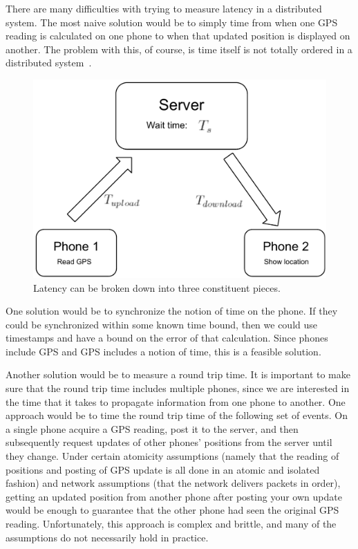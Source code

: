 \documentclass{acm_proc_article-sp}
\begin{document}
There are many difficulties with trying to measure latency in a
distributed system.  The most naive solution would be to simply time
from when one GPS reading is calculated on one phone to when that
updated position is displayed on another. The problem with this, of
course, is time itself is not totally ordered in a distributed
system~\cite{Lamport:1978:TCO}.

\begin{figure}
\centering
\includegraphics[scale=0.4]{figs/LatencyExplanation}
\caption{Latency can be broken down into three constituent pieces.}
\label{fig:LatencyExplanation}
\end{figure}

One solution would be to synchronize the notion of time on the phone.
If they could be synchronized within some known time bound, then we
could use timestamps and have a bound on the error of that
calculation.  Since phones include GPS and GPS includes a notion of
time, this is a feasible solution.

Another solution would be to measure a round trip time.  It is
important to make sure that the round trip time includes multiple
phones, since we are interested in the time that it takes to propagate
information from one phone to another.  One approach would be to time
the round trip time of the following set of events.  On a single phone
acquire a GPS reading, post it to the server, and then subsequently
request updates of other phones' positions from the server until they
change.  Under certain atomicity assumptions (namely that the reading
of positions and posting of GPS update is all done in an atomic and
isolated fashion) and network assumptions (that the network delivers
packets in order), getting an updated position from another phone
after posting your own update would be enough to guarantee that the
other phone had seen the original GPS reading.  Unfortunately, this
approach is complex and brittle, and many of the assumptions do not
necessarily hold in practice.
\end{document}
